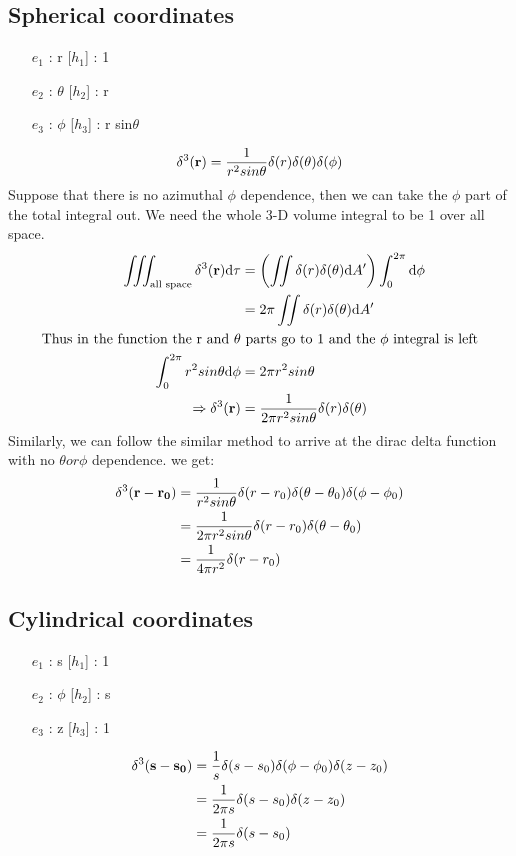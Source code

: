 \documentclass{article}
\begin{document}
\subsection{Spherical coordinates}
\begin{enumerate}
    \item [$e_1$] : r           [$h_1$] : 1    
    \item [$e_2$] : $\theta$    [$h_2$] : r
    \item [$e_3$] : $\phi$      [$h_3$] : r sin$\theta$
\end{enumerate}
\begin{align*}
    \delta^3(\vb{r}) = \frac{1}{r^2 sin\theta}\delta (r) \delta(\theta) \delta(\phi)
\end{align*}
Suppose that there is no azimuthal $\phi$ dependence, then we can take the $\phi$ part of the total integral out. We need the whole 3-D volume integral to be 1 over all space.
\begin{align*}
    \iiint_{\text{all space}} \delta^3(\vb{r}) \dd \tau &= \left( \iint \delta (r) \delta(\theta)\dd A' \right) \int^{2\pi}_0 \dd \phi \\
                                                         &= 2\pi \iint \delta (r) \delta(\theta)\dd A'    \\
    \text{Thus in the function the r and } \theta &\text{ parts go to 1 and the $\phi$ integral is left}\\
    \int^{2\pi}_{0} r^2 sin\theta \dd \phi &= 2\pi r^2 sin\theta \\
    \Rightarrow \delta^3(\vb{r}) &= \frac{1}{2\pi r^2 sin\theta}\delta (r) \delta(\theta)\\    
\end{align*}
Similarly, we can follow the similar method to arrive at the dirac delta function with no $ \theta or \phi$ dependence.
we get:
\begin{align*}
    \delta^3(\vb{r}-\vb{r_0}) &= \frac{1}{r^2 sin\theta}\delta (r-r_0) \delta(\theta-\theta_0) \delta(\phi-\phi_0)\\
                    &= \frac{1}{2 \pi r^2 sin\theta}\delta (r-r_0) \delta(\theta-\theta_0) \\
                    &= \frac{1}{4 \pi r^2} \delta (r-r_0)
\end{align*}
\subsection{Cylindrical coordinates}
\begin{enumerate}
    \item [$e_1$] : s           [$h_1$] : 1    
    \item [$e_2$] : $\phi$      [$h_2$] : s
    \item [$e_3$] : z           [$h_3$] : 1
\end{enumerate}
\begin{align*}
    \delta^3(\vb{s}-\vb{s_0}) &= \frac{1}{s}\delta (s-s_0) \delta(\phi-\phi_0) \delta(z-z_0)\\
                    &= \frac{1}{2 \pi s}\delta (s-s_0) \delta(z-z_0) \\
                    &= \frac{1}{2 \pi s} \delta (s-s_0)
\end{align*}
\newpage
\end{document}
